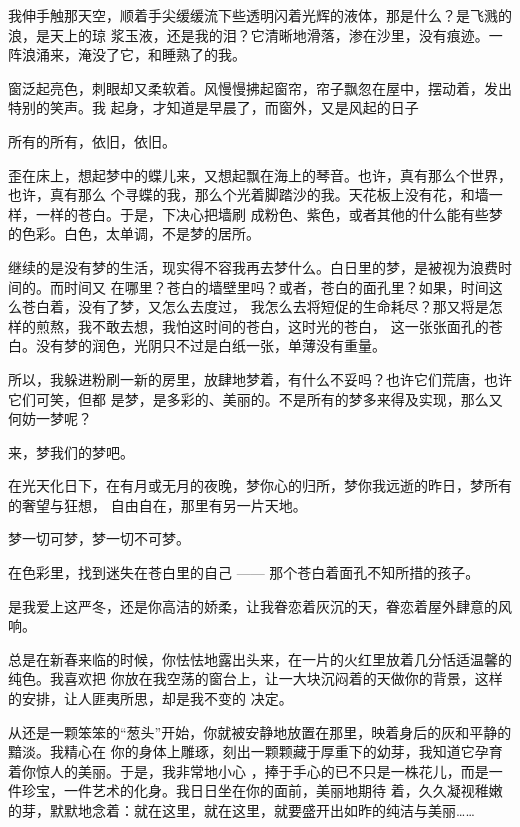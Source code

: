 \documentclass[12pt,a4paper]{article}
\begin{document}
		我伸手触那天空，顺着手尖缓缓流下些透明闪着光辉的液体，那是什么？是飞溅的浪，是天上的琼
	浆玉液，还是我的泪？它清晰地滑落，渗在沙里，没有痕迹。一阵浪涌来，淹没了它，和睡熟了的我。

		窗泛起亮色，刺眼却又柔软着。风慢慢拂起窗帘，帘子飘忽在屋中，摆动着，发出特别的笑声。我
	起身，才知道是早晨了，而窗外，又是风起的日子

		所有的所有，依旧，依旧。

		歪在床上，想起梦中的蝶儿来，又想起飘在海上的琴音。也许，真有那么个世界，也许，真有那么
	个寻蝶的我，那么个光着脚踏沙的我。天花板上没有花，和墙一样，一样的苍白。于是，下决心把墙刷
	成粉色、紫色，或者其他的什么能有些梦的色彩。白色，太单调，不是梦的居所。

		继续的是没有梦的生活，现实得不容我再去梦什么。白日里的梦，是被视为浪费时间的。而时间又
	在哪里？苍白的墙壁里吗？或者，苍白的面孔里？如果，时间这么苍白着，没有了梦，又怎么去度过，
	我怎么去将短促的生命耗尽？那又将是怎样的煎熬，我不敢去想，我怕这时间的苍白，这时光的苍白，
	这一张张面孔的苍白。没有梦的润色，光阴只不过是白纸一张，单薄没有重量。

		所以，我躲进粉刷一新的房里，放肆地梦着，有什么不妥吗？也许它们荒唐，也许它们可笑，但都
	是梦，是多彩的、美丽的。不是所有的梦多来得及实现，那么又何妨一梦呢？

		来，梦我们的梦吧。

		在光天化日下，在有月或无月的夜晚，梦你心的归所，梦你我远逝的昨日，梦所有的奢望与狂想，
	自由自在，那里有另一片天地。

		梦一切可梦，梦一切不可梦。

		在色彩里，找到迷失在苍白里的自己 —— 那个苍白着面孔不知所措的孩子。

	\endwriting



		是我爱上这严冬，还是你高洁的娇柔，让我眷恋着灰沉的天，眷恋着屋外肆意的风响。

		总是在新春来临的时候，你怯怯地露出头来，在一片的火红里放着几分恬适温馨的纯色。我喜欢把
	你放在我空荡的窗台上，让一大块沉闷着的天做你的背景，这样的安排，让人匪夷所思，却是我不变的
	决定。

		从还是一颗笨笨的“葱头”开始，你就被安静地放置在那里，映着身后的灰和平静的黯淡。我精心在
	你的身体上雕琢，刻出一颗颗藏于厚重下的幼芽，我知道它孕育着你惊人的美丽。于是，我非常地小心
	，捧于手心的已不只是一株花儿，而是一件珍宝，一件艺术的化身。我日日坐在你的面前，美丽地期待
	着，久久凝视稚嫩的芽，默默地念着：就在这里，就在这里，就要盛开出如昨的纯洁与美丽……
\end{document}

